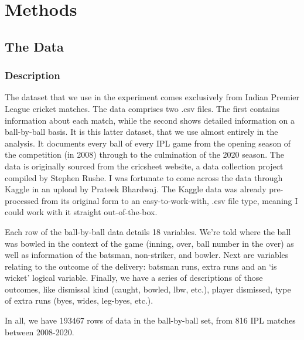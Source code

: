 \titleformat{\chapter}[hang]{\Huge\bfseries}{\thechapter\hsp\textcolor{gray75}{|}\hsp}{0pt}{\Huge\bfseries}
\chapter{Methods}

\section{The Data}

\subsection{Description}

The dataset that we use in the experiment comes exclusively from Indian Premier League cricket matches. The data comprises two .csv files. The first contains information about each match, while the second shows detailed information on a ball-by-ball basis. It is this latter dataset, that we use almost entirely in the analysis. It documents every ball of every IPL game from the opening season of the competition (in 2008) through to the culmination of the 2020 season. The data is originally sourced from the cricsheet \cite{rushe_cricsheet_nodate} website, a data collection project compiled by Stephen Rushe. I was fortunate to come across the data through Kaggle \cite{bhardwaj_ipl_nodate} in an upload by Prateek Bhardwaj. The Kaggle data was already pre-processed from its original form to an easy-to-work-with, .csv file type, meaning I could work with it straight out-of-the-box.

Each row of the ball-by-ball data details 18 variables. We're told where the ball was bowled in the context of the game (inning, over, ball number in the over) as well as information of the batsman, non-striker, and bowler. Next are variables relating to the outcome of the delivery: batsman runs, extra runs and an `is wicket' logical variable. Finally, we have a series of descriptions of those outcomes, like dismissal kind (caught, bowled, lbw, etc.), player dismissed, type of extra runs (byes, wides, leg-byes, etc.).

In all, we have 193467 rows of data in the ball-by-ball set, from 816 IPL matches between 2008-2020.\footnotemark{}


